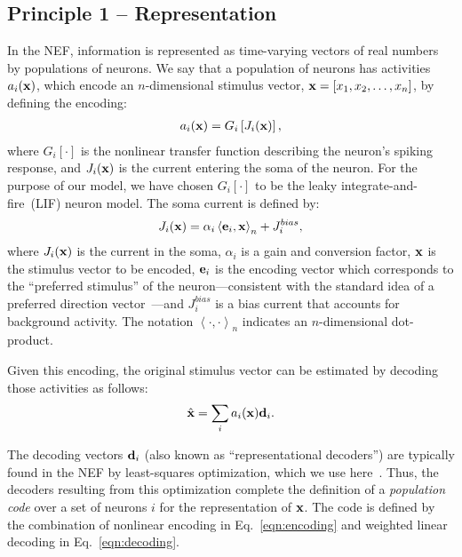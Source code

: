 \documentclass[10pt,letterpaper]{article}
\renewcommand{\vec}[1]{{\bf {#1}}}
\newcommand{\dotp}[3]{\left\langle {#1}, {#2} \right\rangle_{#3}}
\newcommand{\lif}[2]{G_{#1} \left[ {#2} \right]}
\begin{document}
\subsection{Principle 1 -- Representation}
In the NEF, information is represented as time-varying vectors of real numbers by populations of neurons. We say that a population of neurons has activities $a_i(\vec{x})$, which encode an $n$-dimensional stimulus vector, $\vec{x} = \left[ x_1, x_2, \ldots, x_n \right]$, by defining the encoding:
\begin{equation}
\label{eqn:encoding}
\begin{aligned}
a_i(\vec{x}) = \lif{i}{J_i(\vec{x})}, 
\end{aligned}
\end{equation}
where $\lif{i}{\cdot}$ is the nonlinear transfer function describing the neuron's spiking response, and $J_i(\vec{x})$ is the current entering the soma of the neuron. For the purpose of our model, we have chosen $\lif{i}{\cdot}$ to be the leaky integrate-and-fire~(LIF) neuron model. The soma current is defined by:
\begin{equation}
\label{eqn:current}
\begin{aligned}
J_i(\vec{x}) = \alpha_i \dotp{\vec{e}_i}{\vec{x}}{n} + J_i^{bias} ,
\end{aligned}
\end{equation}
where $J_i(\vec{x})$ is the current in the soma, $\alpha_i$ is a gain and conversion factor, $\vec{x}$ is the stimulus vector to be encoded, $\vec{e}_i$ is the encoding vector which corresponds to the ``preferred stimulus'' of the neuron---consistent with the standard idea of a preferred direction vector~\cite{schwartz1988primate}---and $J_i^{bias}$ is a bias current that accounts for background activity. The notation $\dotp{\cdot}{\cdot}{n}$ indicates an $n$-dimensional dot-product.

Given this encoding, the original stimulus vector can be estimated by decoding those activities as follows:
\begin{equation}
\label{eqn:decoding}
\begin{aligned}
\hat{\vec{x}} = \sum_i a_i(\vec{x}) \vec{d}_i .
\end{aligned}
\end{equation}

The decoding vectors $\vec{d}_i$ (also known as ``representational decoders'') are typically found in the NEF by least-squares optimization, which we use here~\cite{eliasmith2003neural}. Thus, the decoders resulting from this optimization complete the definition of a \textit{population code} over a set of neurons $i$ for the representation of $\vec{x}$. The code is defined by the combination of nonlinear encoding in Eq.~\ref{eqn:encoding} and weighted linear decoding in Eq.~\ref{eqn:decoding}.
\end{document}
